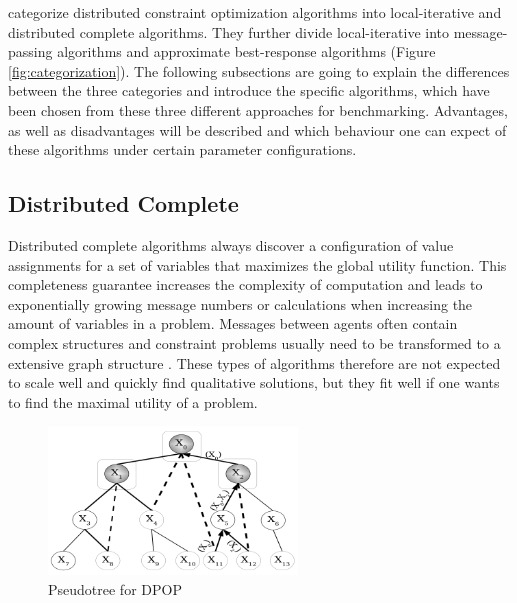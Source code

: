 \cite{Chapman2011} categorize distributed constraint optimization algorithms into local-iterative and distributed complete algorithms. They further divide local-iterative into message-passing algorithms and approximate best-response algorithms (Figure \ref{fig:categorization}). The following subsections are going to explain the differences between the three categories and introduce the specific algorithms, which have been chosen from these three different approaches for benchmarking. Advantages, as well as disadvantages will be described and which behaviour one can expect of these algorithms under certain parameter configurations.

    
\subsection{Distributed Complete}

Distributed complete algorithms always discover a configuration of value assignments for a set of variables that maximizes the global utility function. This completeness guarantee increases the complexity of computation and leads to exponentially growing message numbers or calculations when increasing the amount of variables in a problem. Messages between agents often contain complex structures and constraint problems usually need to be transformed to a extensive graph structure \cite{Chapman2011}. These types of algorithms therefore are not expected to scale well and quickly find qualitative solutions, but they fit well if one wants to find the maximal utility of a problem. 
\begin{figure}[H]
\centering
\includegraphics[width=250px]{graphics/pseudotree}
\caption{Pseudotree for DPOP \cite{Petcu2003}}
\label{fig:pseudotree}
\end{figure}

